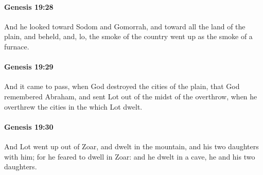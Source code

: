 		\paragraph{Genesis 19:28} %
			\label{GENESIS-19-28}

			And he looked toward Sodom and Gomorrah, and toward all the land of the plain, and beheld, and, lo, the smoke of the country went up as the smoke of a furnace.


		\paragraph{Genesis 19:29} %
			\label{GENESIS-19-29}

			And it came to pass, when God destroyed the cities of the plain, that God remembered Abraham, and sent Lot out of the midst of the overthrow, when he overthrew the cities in the which Lot dwelt.


		\paragraph{Genesis 19:30} %
			\label{GENESIS-19-30}

			And Lot went up out of Zoar, and dwelt in the mountain, and his two daughters with him; for he feared to dwell in Zoar: and he dwelt in a cave, he and his two daughters.


